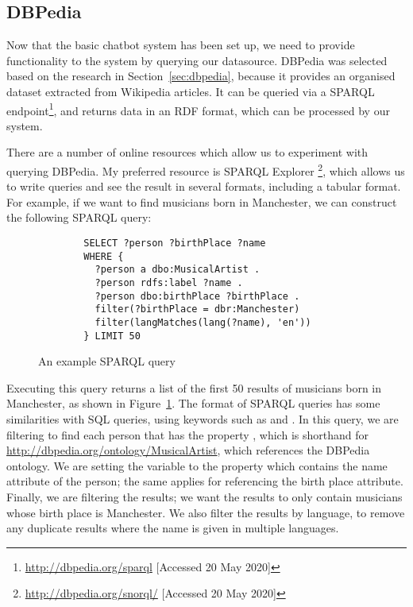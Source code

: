 \subsection{DBPedia}
Now that the basic chatbot system has been set up, we need to provide functionality to the system by querying our datasource. DBPedia was selected based on the research in Section~\ref{sec:dbpedia}, because it provides an organised dataset extracted from Wikipedia articles. It can be queried via a SPARQL endpoint\footnote{\url{http://dbpedia.org/sparql} [Accessed 20 May 2020]}, and returns data in an RDF format, which can be processed by our system.

There are a number of online resources which allow us to experiment with querying DBPedia. My preferred resource is SPARQL Explorer \footnote{\url{http://dbpedia.org/snorql/} [Accessed 20 May 2020]}, which allows us to write queries and see the result in several formats, including a tabular format. For example, if we want to find musicians born in Manchester, we can construct the following SPARQL query:
\begin{figure}[h]
	\centering
	\begin{lstlisting}
		SELECT ?person ?birthPlace ?name
		WHERE {
		  ?person a dbo:MusicalArtist .
		  ?person rdfs:label ?name .
		  ?person dbo:birthPlace ?birthPlace .
		  filter(?birthPlace = dbr:Manchester)
		  filter(langMatches(lang(?name), 'en'))
		} LIMIT 50 
	\end{lstlisting}
	\caption{An example SPARQL query}
	\label{fig:sparql1}
\end{figure}

Executing this query returns a list of the first 50 results of musicians born in Manchester, as shown in Figure~\ref{fig:sparql1}. The format of SPARQL queries has some similarities with SQL queries, using keywords such as  and . In this query, we are filtering to find each person that has the property , which is shorthand for \url{http://dbpedia.org/ontology/MusicalArtist}, which references the DBPedia ontology. We are setting the variable  to the property  which contains the name attribute of the person; the same applies for  referencing the birth place attribute. Finally, we are filtering the results; we want the results to only contain musicians whose birth place is Manchester. We also filter the  results by language, to remove any duplicate results where the name is given in multiple languages.

